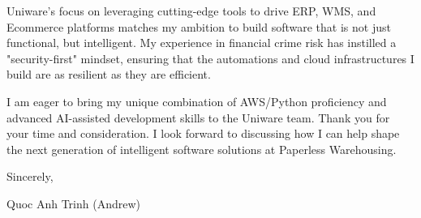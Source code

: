 \documentclass[11pt, a4paper]{article}
\begin{document}
Uniware’s focus on leveraging cutting-edge tools to drive ERP, WMS, and Ecommerce platforms matches my ambition to build software that is not just functional, but intelligent. My experience in financial crime risk has instilled a "security-first" mindset, ensuring that the automations and cloud infrastructures I build are as resilient as they are efficient.

I am eager to bring my unique combination of AWS/Python proficiency and advanced AI-assisted development skills to the Uniware team. Thank you for your time and consideration. I look forward to discussing how I can help shape the next generation of intelligent software solutions at Paperless Warehousing.

\vspace{2em}

Sincerely,

\vspace{1em}

Quoc Anh Trinh (Andrew)
\end{document}
